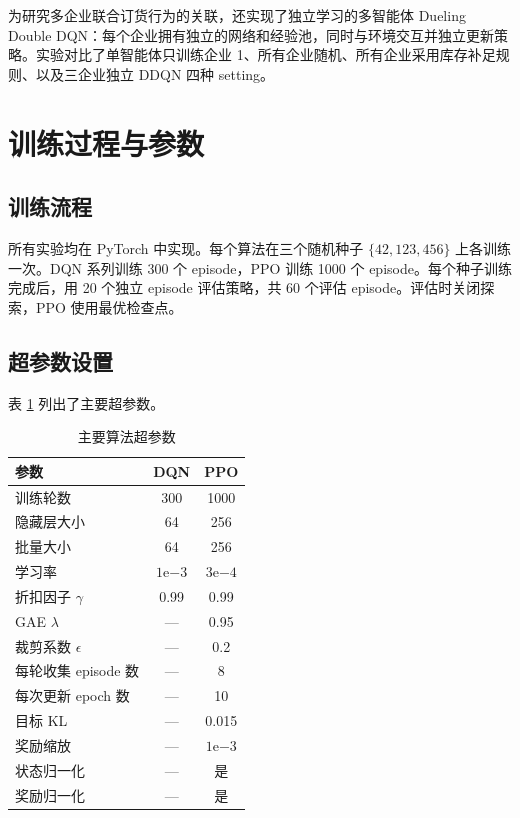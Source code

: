 \documentclass[nohyperref]{article}
\begin{document}
为研究多企业联合订货行为的关联，还实现了独立学习的多智能体 Dueling Double DQN：每个企业拥有独立的网络和经验池，同时与环境交互并独立更新策略。实验对比了单智能体只训练企业 1、所有企业随机、所有企业采用库存补足规则、以及三企业独立 DDQN 四种 setting。

\section{训练过程与参数}
\label{sec:training}

\subsection{训练流程}

所有实验均在 PyTorch 中实现。每个算法在三个随机种子 $\{42,123,456\}$ 上各训练一次。DQN 系列训练 300 个 episode，PPO 训练 1000 个 episode。每个种子训练完成后，用 20 个独立 episode 评估策略，共 60 个评估 episode。评估时关闭探索，PPO 使用最优检查点。

\subsection{超参数设置}

表 \ref{tab:hyperparams} 列出了主要超参数。

\begin{table}[t]
\caption{主要算法超参数}
\label{tab:hyperparams}
\vskip 0.15in
\begin{center}
\begin{small}
\begin{sc}
\begin{tabular}{lcc}
\toprule
参数 & DQN & PPO \\
\midrule
训练轮数 & 300 & 1000 \\
隐藏层大小 & 64 & 256 \\
批量大小 & 64 & 256 \\
学习率 & $1\mathrm{e}{-3}$ & $3\mathrm{e}{-4}$ \\
折扣因子 $\gamma$ & 0.99 & 0.99 \\
GAE $\lambda$ & --- & 0.95 \\
裁剪系数 $\epsilon$ & --- & 0.2 \\
每轮收集 episode 数 & --- & 8 \\
每次更新 epoch 数 & --- & 10 \\
目标 KL & --- & 0.015 \\
奖励缩放 & --- & $1\mathrm{e}{-3}$ \\
状态归一化 & --- & 是 \\
奖励归一化 & --- & 是 \\
\bottomrule
\end{tabular}
\end{sc}
\end{small}
\end{center}
\vskip -0.1in
\end{table}
\end{document}
